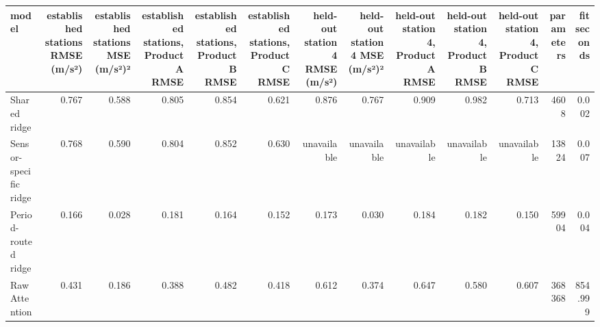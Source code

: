 \begin{tabular}{lrrrrrrrrrrrr}
\toprule
model & established stations RMSE (m/s²) & established stations MSE (m/s²)² & established stations, Product A RMSE & established stations, Product B RMSE & established stations, Product C RMSE & held-out station 4 RMSE (m/s²) & held-out station 4 MSE (m/s²)² & held-out station 4, Product A RMSE & held-out station 4, Product B RMSE & held-out station 4, Product C RMSE & parameters & fit seconds \\
\midrule
Shared ridge & 0.767 & 0.588 & 0.805 & 0.854 & 0.621 & 0.876 & 0.767 & 0.909 & 0.982 & 0.713 & 4608 & 0.002 \\
Sensor-specific ridge & 0.768 & 0.590 & 0.804 & 0.852 & 0.630 & unavailable & unavailable & unavailable & unavailable & unavailable & 13824 & 0.007 \\
Period-routed ridge & 0.166 & 0.028 & 0.181 & 0.164 & 0.152 & 0.173 & 0.030 & 0.184 & 0.182 & 0.150 & 59904 & 0.004 \\
Raw Attention & 0.431 & 0.186 & 0.388 & 0.482 & 0.418 & 0.612 & 0.374 & 0.647 & 0.580 & 0.607 & 368368 & 854.999 \\
\bottomrule
\end{tabular}
